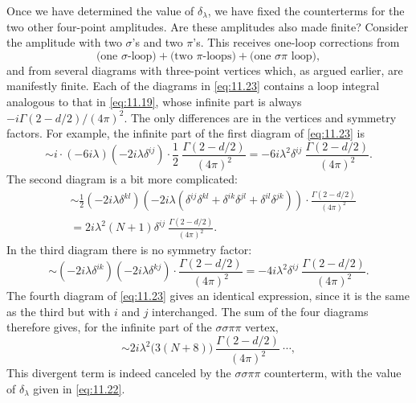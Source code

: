 Once we have determined the value of $\delta_\lambda$, we have fixed the
counterterms for the two other four-point amplitudes.  Are these amplitudes
also made finite?  Consider the amplitude with two $\sigma$'s and two
$\pi$'s.  This receives one-loop corrections from
\begin{equation}
  \text{(one $\sigma$-loop)} + \text{(two $\pi$-loops)} + \text{(one
    $\sigma\pi$ loop)} ,
  \label{eq:11.23}
\end{equation}
and from several diagrams with three-point vertices which, as argued earlier,
are manifestly finite.  Each of the diagrams in \eqref{eq:11.23} contains a
loop integral analogous to that in \eqref{eq:11.19}, whose infinite part is
always $-i\Gamma(2-d/2)/(4\pi)^2$.  The only differences are in the vertices
and symmetry factors.  For example, the infinite part of the first diagram of
\eqref{eq:11.23} is
\begin{equation}
  \sim i\cdot(-6i\lambda)(-2i\lambda\delta^{ij})\cdot
    \frac{1}{2}\ \frac{\Gamma(2-d/2)}{(4\pi)^2}
  = -6i\lambda^2\delta^{ij}\ \frac{\Gamma(2-d/2)}{(4\pi)^2} .
\end{equation}
The second diagram is a bit more complicated:
\begin{equation}
  \begin{aligned}
    &\sim \frac{1}{2}(-2i\lambda\delta^{kl})(-2i\lambda(\delta^{ij}\delta^{kl}
      + \delta^{ik}\delta^{jl} + \delta^{il}\delta^{jk}))\cdot
        \frac{\Gamma(2-d/2)}{(4\pi)^2}\\
    &= 2i\lambda^2(N+1)\delta^{ij}\ \frac{\Gamma(2-d/2)}{(4\pi)^2} .
  \end{aligned}
\end{equation}
In the third diagram there is no symmetry factor:
\begin{equation}
  \sim (-2i\lambda\delta^{ik})(-2i\lambda\delta^{kj})\cdot
    \frac{\Gamma(2-d/2)}{(4\pi)^2}
  = -4i\lambda^2\delta^{ij}\ \frac{\Gamma(2-d/2)}{(4\pi)^2} .
\end{equation}
The fourth diagram of \eqref{eq:11.23} gives an identical expression, since it
is the same as the third but with $i$ and $j$ interchanged.  The sum of the
four diagrams therefore gives, for the infinite part of the
$\sigma\sigma\pi\pi$ vertex,
\begin{equation}
  \sim 2i\lambda^2\bigl( 3(N+8) \bigr)\ \frac{\Gamma(2-d/2)}{(4\pi)^2}
  \ \cdots ,
  \label{eq:11.24}
\end{equation}
This divergent term is indeed canceled by the $\sigma\sigma\pi\pi$
counterterm, with the value of $\delta_\lambda$ given in \eqref{eq:11.22}.

